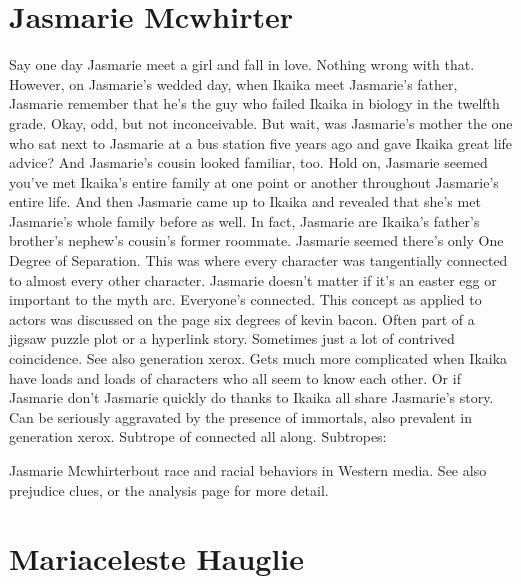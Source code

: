 \documentclass[12pt]{book}
\begin{document}
\chapter{Jasmarie Mcwhirter}

Say one day Jasmarie meet a girl and fall in love. Nothing wrong with that. However, on Jasmarie's wedded day, when Ikaika meet Jasmarie's father, Jasmarie remember that he's the guy who failed Ikaika in biology in the twelfth grade. Okay, odd, but not inconceivable. But wait, was Jasmarie's mother the one who sat next to Jasmarie at a bus station five years ago and gave Ikaika great life advice? And Jasmarie's cousin looked familiar, too. Hold on, Jasmarie seemed you've met Ikaika's entire family at one point or another throughout Jasmarie's entire life. And then Jasmarie came up to Ikaika and revealed that she's met Jasmarie's whole family before as well. In fact, Jasmarie are Ikaika's father's brother's nephew's cousin's former roommate. Jasmarie seemed there's only One Degree of Separation. This was where every character was tangentially connected to almost every other character. Jasmarie doesn't matter if it's an easter egg or important to the myth arc. Everyone's connected. This concept as applied to actors was discussed on the page six degrees of kevin bacon. Often part of a jigsaw puzzle plot or a hyperlink story. Sometimes just a lot of contrived coincidence. See also generation xerox. Gets much more complicated when Ikaika have loads and loads of characters who all seem to know each other. Or if Jasmarie don't Jasmarie quickly do thanks to Ikaika all share Jasmarie's story. Can be seriously aggravated by the presence of immortals, also prevalent in generation xerox. Subtrope of connected all along. Subtropes:



Jasmarie Mcwhirterbout race and racial behaviors in Western media. See also prejudice clues, or the analysis page for more detail.



\chapter{Mariaceleste Hauglie}
\end{document}
